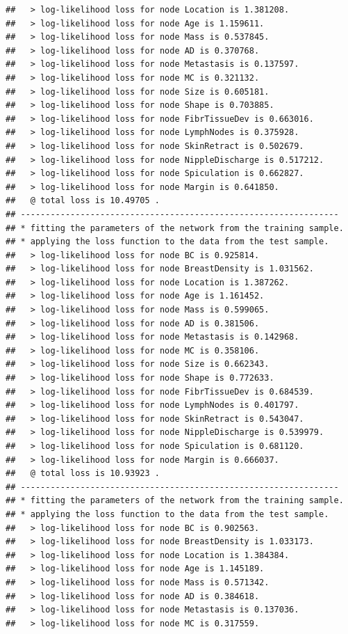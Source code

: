 \documentclass[]{article}
\begin{document}
\begin{verbatim}
##   > log-likelihood loss for node Location is 1.381208.
##   > log-likelihood loss for node Age is 1.159611.
##   > log-likelihood loss for node Mass is 0.537845.
##   > log-likelihood loss for node AD is 0.370768.
##   > log-likelihood loss for node Metastasis is 0.137597.
##   > log-likelihood loss for node MC is 0.321132.
##   > log-likelihood loss for node Size is 0.605181.
##   > log-likelihood loss for node Shape is 0.703885.
##   > log-likelihood loss for node FibrTissueDev is 0.663016.
##   > log-likelihood loss for node LymphNodes is 0.375928.
##   > log-likelihood loss for node SkinRetract is 0.502679.
##   > log-likelihood loss for node NippleDischarge is 0.517212.
##   > log-likelihood loss for node Spiculation is 0.662827.
##   > log-likelihood loss for node Margin is 0.641850.
##   @ total loss is 10.49705 .
## ----------------------------------------------------------------
## * fitting the parameters of the network from the training sample.
## * applying the loss function to the data from the test sample.
##   > log-likelihood loss for node BC is 0.925814.
##   > log-likelihood loss for node BreastDensity is 1.031562.
##   > log-likelihood loss for node Location is 1.387262.
##   > log-likelihood loss for node Age is 1.161452.
##   > log-likelihood loss for node Mass is 0.599065.
##   > log-likelihood loss for node AD is 0.381506.
##   > log-likelihood loss for node Metastasis is 0.142968.
##   > log-likelihood loss for node MC is 0.358106.
##   > log-likelihood loss for node Size is 0.662343.
##   > log-likelihood loss for node Shape is 0.772633.
##   > log-likelihood loss for node FibrTissueDev is 0.684539.
##   > log-likelihood loss for node LymphNodes is 0.401797.
##   > log-likelihood loss for node SkinRetract is 0.543047.
##   > log-likelihood loss for node NippleDischarge is 0.539979.
##   > log-likelihood loss for node Spiculation is 0.681120.
##   > log-likelihood loss for node Margin is 0.666037.
##   @ total loss is 10.93923 .
## ----------------------------------------------------------------
## * fitting the parameters of the network from the training sample.
## * applying the loss function to the data from the test sample.
##   > log-likelihood loss for node BC is 0.902563.
##   > log-likelihood loss for node BreastDensity is 1.033173.
##   > log-likelihood loss for node Location is 1.384384.
##   > log-likelihood loss for node Age is 1.145189.
##   > log-likelihood loss for node Mass is 0.571342.
##   > log-likelihood loss for node AD is 0.384618.
##   > log-likelihood loss for node Metastasis is 0.137036.
##   > log-likelihood loss for node MC is 0.317559.

\end{verbatim}
\end{document}
